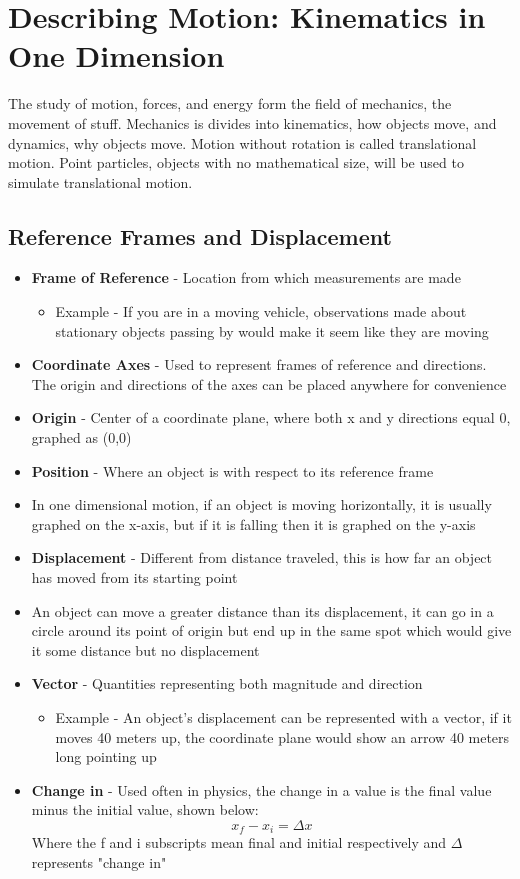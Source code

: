 \section{Describing Motion: Kinematics in One Dimension}
The study of motion, forces, and energy form the field of mechanics, the movement of stuff. Mechanics is divides into kinematics, how objects move, and dynamics, why objects move. Motion without rotation is called translational motion. Point particles, objects with no mathematical size, will be used to simulate translational motion.

\subsection{Reference Frames and Displacement}
\begin{itemize}
    \item \textbf{Frame of Reference} - Location from which measurements are made
    \begin{itemize}
        \item Example - If you are in a moving vehicle, observations made about stationary objects passing by would make it seem like they are moving
    \end{itemize}
    \item \textbf{Coordinate Axes} - Used to represent frames of reference and directions. The origin and directions of the axes can be placed anywhere for convenience
    \item \textbf{Origin} - Center of a coordinate plane, where both x and y directions equal 0, graphed as (0,0)
    \item \textbf{Position} - Where an object is with respect to its reference frame
    \item In one dimensional motion, if an object is moving horizontally, it is usually graphed on the x-axis, but if it is falling then it is graphed on the y-axis
    \item \textbf{Displacement} - Different from distance traveled, this is how far an object has moved from its starting point
    \item An object can move a greater distance than its displacement, it can go in a circle around its point of origin but end up in the same spot which would give it some distance but no displacement
    \item \textbf{Vector} - Quantities representing both magnitude and direction
    \begin{itemize}
        \item Example - An object's displacement can be represented with a vector, if it moves 40 meters up, the coordinate plane would show an arrow 40 meters long pointing up
    \end{itemize}
    \item \textbf{Change in} - Used often in physics, the change in a value is the final value minus the initial value, shown below: \[x_f-x_i=\Delta x\]
    Where the f and i subscripts mean final and initial respectively and $\Delta$ represents "change in"
\end{itemize}


